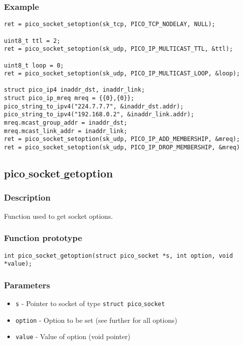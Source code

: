 \subsubsection*{Example}
\begin{verbatim}
ret = pico_socket_setoption(sk_tcp, PICO_TCP_NODELAY, NULL);

uint8_t ttl = 2;
ret = pico_socket_setoption(sk_udp, PICO_IP_MULTICAST_TTL, &ttl);

uint8_t loop = 0;
ret = pico_socket_setoption(sk_udp, PICO_IP_MULTICAST_LOOP, &loop);

struct pico_ip4 inaddr_dst, inaddr_link;
struct pico_ip_mreq mreq = {{0},{0}};
pico_string_to_ipv4("224.7.7.7", &inaddr_dst.addr);
pico_string_to_ipv4("192.168.0.2", &inaddr_link.addr);
mreq.mcast_group_addr = inaddr_dst;
mreq.mcast_link_addr = inaddr_link;
ret = pico_socket_setoption(sk_udp, PICO_IP_ADD_MEMBERSHIP, &mreq);
ret = pico_socket_setoption(sk_udp, PICO_IP_DROP_MEMBERSHIP, &mreq)
\end{verbatim}


\subsection{pico$\_$socket$\_$getoption}

\subsubsection*{Description}
Function used to get socket options.

\subsubsection*{Function prototype}
\begin{verbatim}
int pico_socket_getoption(struct pico_socket *s, int option, void *value);
\end{verbatim}

\subsubsection*{Parameters}
\begin{itemize}[noitemsep]
\item \texttt{s} - Pointer to socket of type \texttt{struct pico$\_$socket}
\item \texttt{option} - Option to be set (see further for all options)
\item \texttt{value} - Value of option (void pointer)
\end{itemize}

